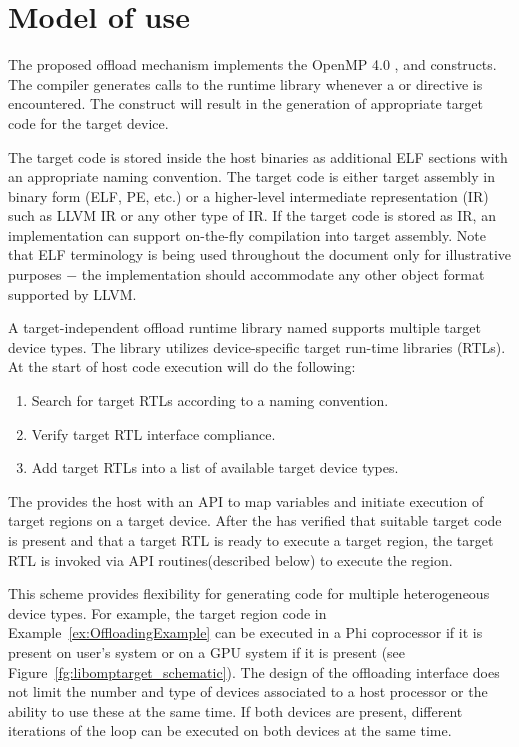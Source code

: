\section{Model of use}

The proposed offload mechanism implements the OpenMP 4.0 \dtargetdata{}, \dtarget{} and \ddeclaretarget{} constructs. The compiler generates calls to the runtime library whenever a \dtargetdata{} or \dtarget{} directive is encountered. The \ddeclaretarget{} construct will result in the generation of appropriate target code for the target device.

The target code is stored inside the host binaries as additional ELF sections with an appropriate naming convention. The target code is either target assembly in binary form (ELF, PE, etc.) or a higher-level intermediate representation (IR) such as LLVM IR or any other type of IR. If the target code is stored as IR, an implementation can support on-the-fly compilation into target assembly. Note that ELF terminology is being used throughout the document only for illustrative purposes $-$ the implementation should accommodate any other object format supported by LLVM.

A target-independent offload runtime library named \libomptarget{} supports multiple target device types. The \libomptarget{} library utilizes device-specific target run-time libraries (RTLs). At the start of host code execution \libomptarget{} will do the following:

\begin{enumerate}
  \item Search for target RTLs according to a naming convention. 

  \item Verify target RTL interface compliance.

  \item Add target RTLs into a list of available target device types. 
\end{enumerate}

The \libomptarget{} provides the host with an API to map variables and initiate execution of target regions on a target device. After the \libomptarget{} has verified that suitable target code is present and that a target RTL is ready to execute a target region, the target RTL is invoked via API routines(described below) to execute the region.

This scheme provides flexibility for generating code for multiple heterogeneous device types. For example, the target region code in Example~\ref{ex:OffloadingExample} can be executed in a Phi\texttrademark{} coprocessor if it is present on user’s system or on a GPU system if it is present (see Figure~\ref{fg:libomptarget_schematic}). The design of the offloading interface does not limit the number and type of devices associated to a host processor or the ability to use these at the same time. If both devices are present, different iterations of the loop can be executed on both devices at the same time.

